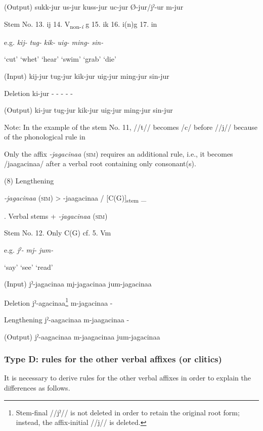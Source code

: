 (Output)  sukk-jur  us-jur  kuss-jur  uc{}-jur  Ø-jur/jˀ-ur  m-jur

Stem No.  13. ij  14. V\textsubscript{non-}\textit{\textsubscript{i}} g  15. ik  16. i(n)g    17. in

e.g.  \textit{kij-}  \textit{tug-}  \textit{kik-}  \textit{uig-}  \textit{ming-}  \textit{sin-}

  ‘cut’  ‘whet’  ‘hear’  ‘swim’  ‘grab’  ‘die’

(Input)  kij-jur  tug-jur  kik-jur  uig-jur  ming-jur  sin-jur

Deletion  ki-jur  {}-  {}-  {}-  {}-  {}-

(Output)  ki-jur  tug-jur  kik-jur  uig-jur  ming-jur  sin-jur

Note: In the example of the stem No. 11, //t// becomes /c/ before //j// because of the phonological rule in 

Only the affix \textit{{}-jagacinaa} (\textsc{sim}) requires an additional rule, i.e., it becomes /jaagacinaa/ after a verbal root containing only consonant(s).

(8)  Lengthening

  \textit{{}-jagacinaa} (\textsc{sim})  >  {}-jaagacinaa  /  [C(G)]\textsubscript{stem}  \_

\begin{styleBeschriftung}
\textmd{. Verbal stems +} \textmd{\textit{{}-jagacinaa}}\textmd{ (\textsc{sim})}
\end{styleBeschriftung}

Stem No.  12. Only C(G)    cf.  5. Vm

e.g.  \textit{jˀ-}  \textit{mj-}      \textit{jum-}

  ‘say’  ‘see’      ‘read’

(Input)  jˀ-jagacinaa  mj-jagacinaa      jum-jagacinaa

Deletion  jˀ-agacinaa\footnote{Stem-final //jˀ// is not deleted in order to retain the original root form; instead, the affix-initial //j// is deleted.}  m-jagacinaa      {}-

Lengthening  jˀ-aagacinaa  m-jaagacinaa      {}-

(Output)  jˀ-aagacinaa  m-jaagacinaa      jum-jagacinaa

\subsubsection{Type D: rules for the other verbal affixes (or clitics)}
\label{bkm:Ref347177096}
It is necessary to derive rules for the other verbal affixes in order to explain the differences as follows.

